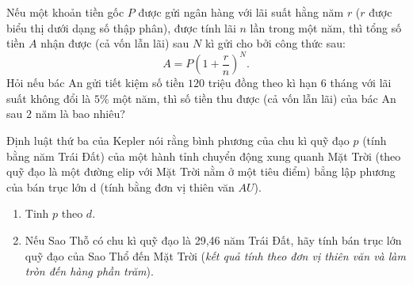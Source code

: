 \begin{baitap}%
	Nếu một khoản tiền gốc $P$ được gửi ngân hàng với lãi suất hằng năm $r$ ($r$ được biểu thị dưới dạng số thập phân), được tính lãi $n$ lần trong một năm, thì tổng số tiền $A$ nhận được (cả vốn lẫn lãi) sau $N$ kì gửi cho bởi công thức sau:
	$$
	A=P\left(1+\dfrac{r}{n}\right)^N .
	$$
	Hỏi nếu bác An gửi tiết kiệm số tiền $120$ triệu đồng theo kì hạn $6$ tháng với lãi suất không đổi là $5 \%$ một năm, thì số tiền thu được (cả vốn lẫn lãi) của bác An sau $2$ năm là bao nhiêu?
\end{baitap} 
\begin{baitap}
	Định luật thứ ba của Kepler nói rằng bình phương của chu kì quỹ đạo $p$ (tính bằng năm Trái Đất) của một hành tỉnh chuyển động xung quanh Mặt Trời (theo quỹ đạo là một đường elip với Mặt Trời nằm ở một tiêu điểm) bẳng lập phương của bán trục lớn d (tính bằng đơn vị thiên văn $AU$).
	\begin{enumerate}
		\item  Tinh $p$ theo $d$.
		\item  Nếu Sao Thỗ có chu kì quỹ đạo là 29,46 năm Trái Đất, hãy tính bán trục lớn quỹ đạo của Sao Thổ đến Mặt Trời (\textit{kết quả tính theo đơn vị thiên văn và làm tròn đến hàng phần trăm}).
	\end{enumerate}
\end{baitap} 

